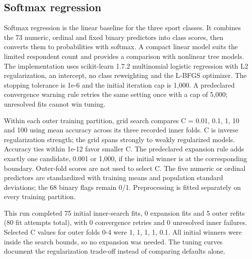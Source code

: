 \subsection{Softmax regression}
Softmax regression is the linear baseline for the three sport classes. It combines the 73 numeric, ordinal and fixed binary predictors into class scores, then converts them to probabilities with softmax. A compact linear model suits the limited respondent count and provides a comparison with nonlinear tree models. The implementation uses scikit-learn 1.7.2 multinomial logistic regression with L2 regularization, an intercept, no class reweighting and the L-BFGS optimizer. The stopping tolerance is 1e-6 and the initial iteration cap is 1,000. A predeclared convergence warning rule retries the same setting once with a cap of 5,000; unresolved fits cannot win tuning.\cite{sklearn_logistic}

Within each outer training partition, grid search compares C = 0.01, 0.1, 1, 10 and 100 using mean accuracy across its three recorded inner folds. C is inverse regularization strength; the grid spans strongly to weakly regularized models. Accuracy ties within 1e-12 favor smaller C. The predeclared expansion rule adds exactly one candidate, 0.001 or 1,000, if the initial winner is at the corresponding boundary. Outer-fold scores are not used to select C. The five numeric or ordinal predictors are standardized with training means and population standard deviations; the 68 binary flags remain 0/1. Preprocessing is fitted separately on every training partition.

This run completed 75 initial inner-search fits, 0 expansion fits and 5 outer refits (80 fit attempts total), with 0 convergence retries and 0 unresolved inner failures. Selected C values for outer folds 0-4 were 1, 1, 1, 1, 0.1. All initial winners were inside the search bounds, so no expansion was needed. The tuning curves document the regularization trade-off instead of comparing defaults alone.
